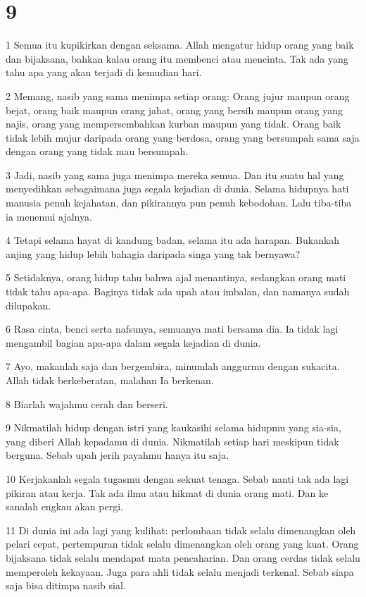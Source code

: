 \chapter{9}

\par 1 Semua itu kupikirkan dengan seksama. Allah mengatur hidup orang yang baik dan bijaksana, bahkan kalau orang itu membenci atau mencinta. Tak ada yang tahu apa yang akan terjadi di kemudian hari.
\par 2 Memang, nasib yang sama menimpa setiap orang: Orang jujur maupun orang bejat, orang baik maupun orang jahat, orang yang bersih maupun orang yang najis, orang yang mempersembahkan kurban maupun yang tidak. Orang baik tidak lebih mujur daripada orang yang berdosa, orang yang bersumpah sama saja dengan orang yang tidak mau bersumpah.
\par 3 Jadi, nasib yang sama juga menimpa mereka semua. Dan itu suatu hal yang menyedihkan sebagaimana juga segala kejadian di dunia. Selama hidupnya hati manusia penuh kejahatan, dan pikirannya pun penuh kebodohan. Lalu tiba-tiba ia menemui ajalnya.
\par 4 Tetapi selama hayat di kandung badan, selama itu ada harapan. Bukankah anjing yang hidup lebih bahagia daripada singa yang tak bernyawa?
\par 5 Setidaknya, orang hidup tahu bahwa ajal menantinya, sedangkan orang mati tidak tahu apa-apa. Baginya tidak ada upah atau imbalan, dan namanya sudah dilupakan.
\par 6 Rasa cinta, benci serta nafsunya, semuanya mati bersama dia. Ia tidak lagi mengambil bagian apa-apa dalam segala kejadian di dunia.
\par 7 Ayo, makanlah saja dan bergembira, minumlah anggurmu dengan sukacita. Allah tidak berkeberatan, malahan Ia berkenan.
\par 8 Biarlah wajahmu cerah dan berseri.
\par 9 Nikmatilah hidup dengan istri yang kaukasihi selama hidupmu yang sia-sia, yang diberi Allah kepadamu di dunia. Nikmatilah setiap hari meskipun tidak berguna. Sebab upah jerih payahmu hanya itu saja.
\par 10 Kerjakanlah segala tugasmu dengan sekuat tenaga. Sebab nanti tak ada lagi pikiran atau kerja. Tak ada ilmu atau hikmat di dunia orang mati. Dan ke sanalah engkau akan pergi.
\par 11 Di dunia ini ada lagi yang kulihat: perlombaan tidak selalu dimenangkan oleh pelari cepat, pertempuran tidak selalu dimenangkan oleh orang yang kuat. Orang bijaksana tidak selalu mendapat mata pencaharian. Dan orang cerdas tidak selalu memperoleh kekayaan. Juga para ahli tidak selalu menjadi terkenal. Sebab siapa saja bisa ditimpa nasib sial.

